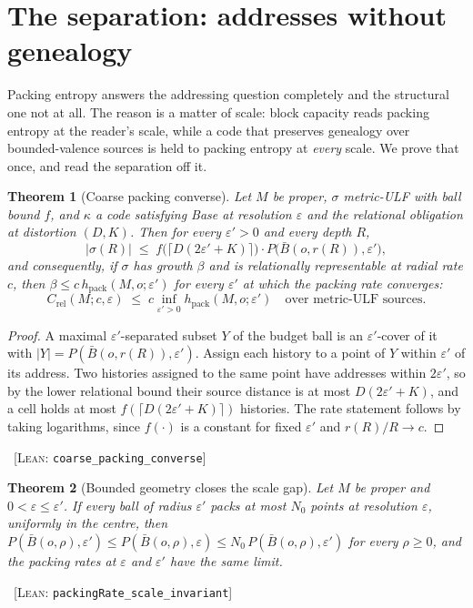 \documentclass[11pt,reqno]{amsart}
\theoremstyle{plain}
\newtheorem{theorem}{Theorem}[section]
\theoremstyle{definition}
\newcommand{\hpack}{h_{\mathrm{pack}}}
\newcommand{\Crel}{C_{\mathrm{rel}}}
\newcommand{\eps}{\varepsilon}
\newcommand{\cert}[1]{{\footnotesize\ [\textsc{Lean}: \texttt{#1}]}}
\begin{document}
\section{The separation: addresses without genealogy}\label{sec:balloon}

Packing entropy answers the addressing question completely and the structural one not at all. The reason is a matter of scale: block capacity reads packing entropy at the reader's scale, while a code that preserves genealogy over bounded-valence sources is held to packing entropy at \emph{every} scale. We prove that once, and read the separation off it.

\begin{theorem}[Coarse packing converse]\label{thm:coarse}
Let $M$ be proper, $\sigma$ metric-ULF with ball bound $f$, and $\kappa$ a code satisfying Base at resolution $\eps$ and the relational obligation at distortion $(D,K)$. Then for every $\eps'>0$ and every depth $R$,
\[
|\sigma(R)|\;\le\;f\bigl(\lceil D(2\eps'+K)\rceil\bigr)\cdot P\bigl(\bar B(o,r(R)),\eps'\bigr),
\]
and consequently, if $\sigma$ has growth $\beta$ and is relationally representable at radial rate $c$, then $\beta\le c\,\hpack(M,o;\eps')$ for every $\eps'$ at which the packing rate converges:
\[
\Crel(M;c,\eps)\;\le\;c\inf_{\eps'>0}\hpack(M,o;\eps')\quad\text{over metric-ULF sources.}
\]
\end{theorem}

\begin{proof}
A maximal $\eps'$-separated subset $Y$ of the budget ball is an $\eps'$-cover of it with $|Y|=P(\bar B(o,r(R)),\eps')$. Assign each history to a point of $Y$ within $\eps'$ of its address. Two histories assigned to the same point have addresses within $2\eps'$, so by the lower relational bound their source distance is at most $D(2\eps'+K)$, and a cell holds at most $f(\lceil D(2\eps'+K)\rceil)$ histories. The rate statement follows by taking logarithms, since $f(\cdot)$ is a constant for fixed $\eps'$ and $r(R)/R\to c$.
\end{proof}\cert{coarse\_\allowbreak{}packing\_\allowbreak{}converse}


\begin{theorem}[Bounded geometry closes the scale gap]\label{thm:scaleinv}
Let $M$ be proper and $0<\eps\le\eps'$. If every ball of radius $\eps'$ packs at most $N_0$ points at resolution $\eps$, uniformly in the centre, then $P(\bar B(o,\rho),\eps')\le P(\bar B(o,\rho),\eps)\le N_0\,P(\bar B(o,\rho),\eps')$ for every $\rho\ge0$, and the packing rates at $\eps$ and $\eps'$ have the same limit.
\end{theorem}\cert{packingRate\_\allowbreak{}scale\_\allowbreak{}invariant}
\end{document}
